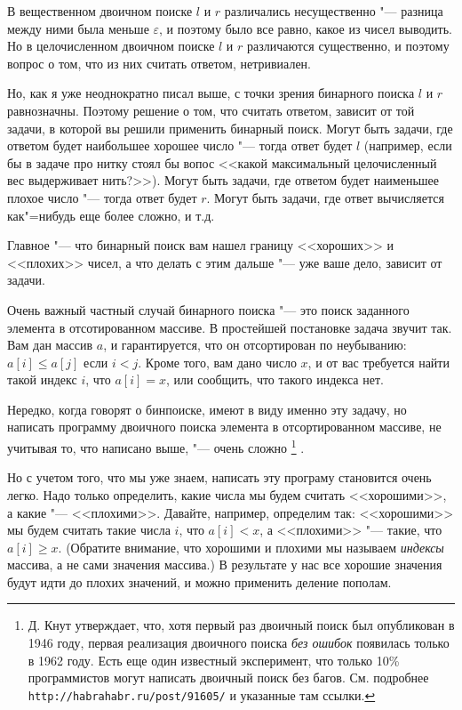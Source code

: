 \documentclass[a4paper,10pt]{problems}
\let\eps\varepsilon
\begin{document}
В вещественном двоичном поиске $l$ и $r$ различались несущественно "--- разница между ними
была меньше $\eps$, и поэтому было все равно, какое из чисел выводить. 
Но в целочисленном двоичном поиске $l$ и $r$ различаются существенно, и поэтому
вопрос о том, что из них считать ответом, нетривиален.

Но, как я уже неоднократно писал выше, с точки зрения бинарного поиска $l$ и $r$ равнозначны.
Поэтому решение о том, что считать ответом, зависит от той задачи, в которой
вы решили применить бинарный поиск. 
Могут быть задачи, где ответом будет наибольшее хорошее число "--- тогда ответ будет $l$
(например, если бы в задаче про нитку стоял бы вопос <<какой максимальный целочисленный вес выдерживает нить?>>).
Могут быть задачи, где ответом будет наименьшее плохое число "--- тогда ответ будет $r$.
Могут быть задачи, где ответ вычисляется как"=нибудь еще более сложно, и т.д.

Главное "--- что бинарный поиск вам нашел границу <<хороших>> и <<плохих>> чисел,
а что делать с этим дальше "--- уже ваше дело, зависит от задачи.

Очень важный частный случай бинарного поиска "--- это поиск заданного элемента в отсотированном массиве.
В простейшей постановке задача звучит так.
Вам дан массив $a$, и гарантируется, что он отсортирован по неубыванию: $a[i]\leq a[j]$ если $i<j$.
Кроме того, вам дано число $x$, и от вас требуется найти такой индекс $i$, что $a[i]=x$,
или сообщить, что такого индекса нет.

Нередко, когда говорят о бинпоиске, имеют в виду именно эту задачу, но написать программу
двоичного поиска элемента в отсортированном массиве, не учитывая то, что написано выше,
"--- очень сложно%
\footnote{Д. Кнут утверждает, что, хотя первый раз двоичный поиск был опубликован в 1946 году,
первая реализация двоичного поиска \textit{без ошибок} появилась только в 1962 году. 
Есть еще один известный эксперимент, что только 10\% программистов могут написать двоичный поиск без багов.
См. подробнее \texttt{http://habrahabr.ru/post/91605/} и указанные там ссылки.}%
.

Но с учетом того, что мы уже знаем, написать эту програму становится очень легко. 
Надо только определить, какие числа мы будем считать <<хорошими>>, а какие "--- <<плохими>>.
Давайте, например, определим так: <<хорошими>> мы будем считать такие числа $i$, что $a[i]<x$,
а <<плохими>> "--- такие, что $a[i]\geq x$. 
(Обратите внимание, что хорошими и плохими мы называем \textit{индексы} массива, а не сами значения массива.)
В результате у нас все хорошие значения будут идти до плохих значений, и можно применить деление пополам.
\end{document}
